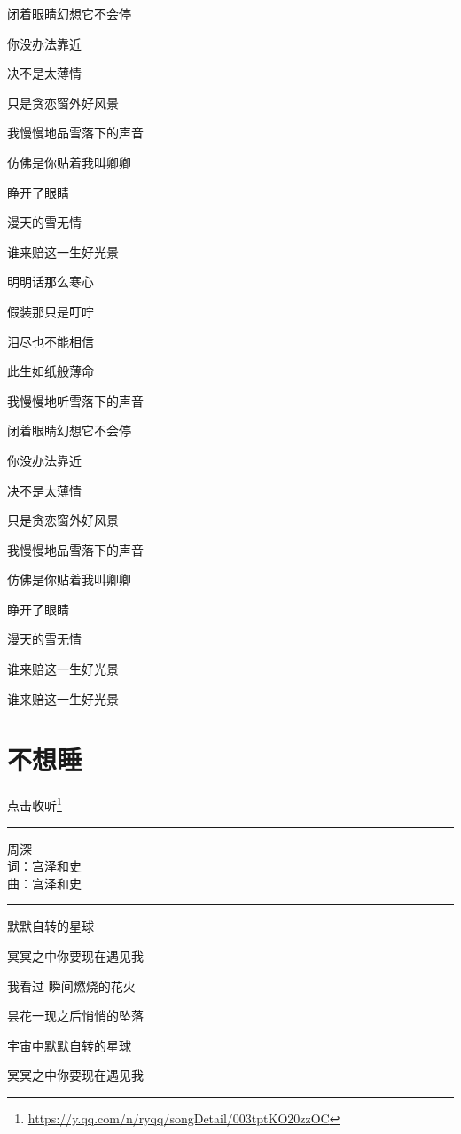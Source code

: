 \documentclass[]{ctexbook}
\renewcommand{\href}[2]{#2\footnote{\url{#1}}}
\begin{document}
闭着眼睛幻想它不会停

你没办法靠近

决不是太薄情

只是贪恋窗外好风景

我慢慢地品雪落下的声音

仿佛是你贴着我叫卿卿

睁开了眼睛

漫天的雪无情

谁来赔这一生好光景

明明话那么寒心

假装那只是叮咛

泪尽也不能相信

此生如纸般薄命

我慢慢地听雪落下的声音

闭着眼睛幻想它不会停

你没办法靠近

决不是太薄情

只是贪恋窗外好风景

我慢慢地品雪落下的声音

仿佛是你贴着我叫卿卿

睁开了眼睛

漫天的雪无情

谁来赔这一生好光景

谁来赔这一生好光景

\section*{不想睡}\label{donot-want-to-sleep}


\href{https://y.qq.com/n/ryqq/songDetail/003tptKO20zzOC}{点击收听}

\begin{center}\rule{0.5\linewidth}{0.5pt}\end{center}

周深\\
词：宫泽和史\\
曲：宫泽和史

\begin{center}\rule{0.5\linewidth}{0.5pt}\end{center}

默默自转的星球

冥冥之中你要现在遇见我

我看过 瞬间燃烧的花火

昙花一现之后悄悄的坠落

宇宙中默默自转的星球

冥冥之中你要现在遇见我
\end{document}
